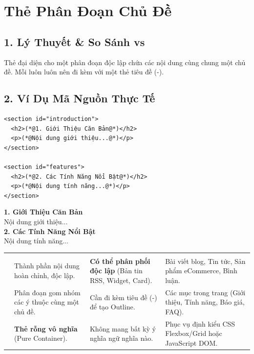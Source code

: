 \section{Thẻ Phân Đoạn Chủ Đề }
\subsection{1. Lý Thuyết \& So Sánh  vs }
Thẻ  đại diện cho một phân đoạn độc lập chứa các nội dung cùng chung một chủ đề. Mỗi  luôn luôn nên đi kèm với một thẻ tiêu đề (-).

\subsection{2. Ví Dụ Mã Nguồn Thực Tế}
\begin{codeWindow}
\begin{lstlisting}[language=HTML5]
<section id="introduction">
  <h2>(*@1. Giới Thiệu Căn Bản@*)</h2>
  <p>(*@Nội dung giới thiệu...@*)</p>
</section>

<section id="features">
  <h2>(*@2. Các Tính Năng Nổi Bật@*)</h2>
  <p>(*@Nội dung tính năng...@*)</p>
</section>
\end{lstlisting}
\end{codeWindow}

\begin{browserWindow}
\sffamily\small
{\bfseries\large 1. Giới Thiệu Căn Bản}\\[2pt]
Nội dung giới thiệu...\\[6pt]
{\bfseries\large 2. Các Tính Năng Nổi Bật}\\[2pt]
Nội dung tính năng...
\end{browserWindow}

\begin{prettyTableBox}
\small
{}
\begin{tabularx}{\linewidth}{K{2.2cm} Z Z K{3.5cm}}
 &  &  &  \\
 & Thành phần nội dung hoàn chỉnh, độc lập. & \textbf{Có thể phân phối độc lập} (Bản tin RSS, Widget, Card). & Bài viết blog, Tin tức, Sản phẩm eCommerce, Bình luận. \\
 & Phân đoạn gom nhóm các ý thuộc cùng một chủ đề. & Cần đi kèm tiêu đề (-) để tạo Outline. & Các mục trong trang (Giới thiệu, Tính năng, Báo giá, FAQ). \\
 & \textbf{Thẻ rỗng vô nghĩa} (Pure Container). & Không mang bất kỳ ý nghĩa ngữ nghĩa nào. & Phục vụ định kiểu CSS Flexbox/Grid hoặc JavaScript DOM. \\
\end{tabularx}
\end{prettyTableBox}


